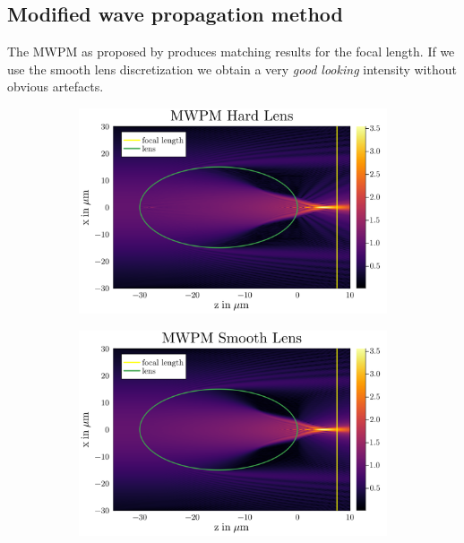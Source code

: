 \documentclass[a4paper,12pt]{article}
\begin{document}
\subsection{Modified wave propagation method}
The MWPM as proposed by \cite{schmidt2016wave} produces matching results for the focal length. If we use the smooth lens discretization we obtain a very \textit{good looking} intensity without obvious artefacts.
\begin{figure}[h]
    \centering
    \begin{subfigure}[]{0.5\textwidth}
        \centering
        \includegraphics[width=\textwidth]{../figures/MWPM_hard.svg.png} 
    \end{subfigure}%
    \begin{subfigure}[]{0.5\textwidth}
        \centering
        \includegraphics[width=\textwidth]{../figures/MWPM_soft.svg.png} 
    \end{subfigure}
    \caption{}
    \label{fig:}
\end{figure}
\end{document}
